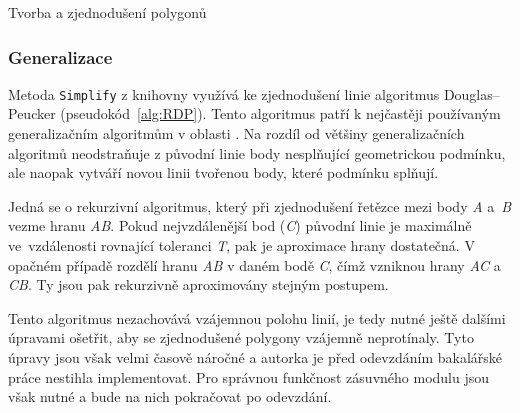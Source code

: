 \begin{algorithm}
\caption{Tvorba a zjednodušení polygonů}
\label{alg:polygon}
    \begin{algorithmic}[1] 
			\ELSE
			\ENDIF
		\ENDWHILE	
	\ENDWHILE
    \end{algorithmic}
\end{algorithm}

\newpage
\subsubsection{Generalizace}
Metoda \texttt{Simplify} z knihovny  využívá ke zjednodušení
linie algoritmus Douglas–Peucker (pseudokód~\ref{alg:RDP}). Tento
algoritmus patří k nejčastěji používaným generalizačním algoritmům v
oblasti . Na rozdíl od většiny generalizačních algoritmů
neodstraňuje z původní linie body nesplňující geometrickou podmínku,
ale naopak vytváří novou linii tvořenou body, které podmínku splňují.
	
Jedná se o rekurzivní algoritmus, který při zjednodušení řetězce mezi
body \textit{A} a~\textit{B} vezme hranu \textit{AB}. Pokud
nejvzdálenější bod (\textit{C}) původní linie je maximálně 
ve~vzdálenosti rovnající toleranci \textit{T}, pak je aproximace hrany
dostatečná. V opačném případě rozdělí hranu \textit{AB} v daném bodě
\textit{C}, čímž vzniknou hrany \textit{AC} a \textit{CB}. Ty jsou pak
rekurzivně aproximovány stejným
postupem. \cite{hershberger1992speeding}

Tento algoritmus nezachovává vzájemnou polohu linií, je tedy nutné
ještě dalšími úpravami ošetřit, aby se zjednodušené polygony vzájemně
neprotínaly. Tyto úpravy jsou však velmi časově náročné a autorka je
před odevzdáním bakalářské práce nestihla implementovat. Pro správnou
funkčnost zásuvného modulu jsou však nutné a bude na nich pokračovat
po odevzdání.
	

